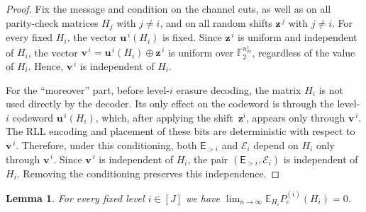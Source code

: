 \documentclass[journal,letterpaper,onecolumn,11pt]{IEEEtran}
\newcommand{\cE}{\mathcal{E}}
\newcommand{\boldu}{\mathbf{u}}
\newcommand{\boldv}{\mathbf{v}}
\newcommand{\boldz}{\mathbf{z}}
\newtheorem{lemma}{Lemma}
\begin{document}
\begin{proof}
Fix the message and condition on the channel cuts, as well as on all parity-check
matrices \(H_j\) with \(j\neq i\), and on all random shifts \(\boldz^{\,j}\) with \(j\neq i\). 
For every fixed \(H_i\), the vector
\(\boldu^{\,i}(H_i)\) is fixed. Since \(\boldz^{\,i}\) is uniform and
independent of \(H_i\), the vector
\(\boldv^{\,i}=\boldu^{\,i}(H_i)\oplus\boldz^{\,i}\) is uniform over
\(\mathbb F_2^{n_{\mathrm{er}}^i}\), regardless of the value of \(H_i\).
Hence, \(\boldv^{\,i}\) is independent of \(H_i\).

For the ``moreover'' part, before level-\(i\) erasure decoding,
the matrix \(H_i\) is not used directly by the decoder. Its only effect
on the codeword is through the level-\(i\) codeword
\(\boldu^{\,i}(H_i)\), which, after applying the shift~$\boldz^i$, appears only
through \(\boldv^{\,i}\). 
The RLL encoding and placement of these bits
are deterministic with respect to \(\boldv^{\,i}\).
Therefore, under this conditioning, both \(\mathsf E_{>i}\) and
\(\cE_i\) depend on \(H_i\) only through \(\boldv^{\,i}\).
Since \(\boldv^{\,i}\) is independent of \(H_i\), the pair
\((\mathsf E_{>i},\cE_i)\) is independent of \(H_i\).
Removing the conditioning preserves this independence.
\end{proof}

\begin{lemma}\label{lemma:random_matrix_capacity}
For every fixed level \(i\in[J]\) we have $\lim_{n\to\infty}\mathbb E_{H_i}\!P_e^{(i)}(H_i)=0$.
\end{lemma}
\end{document}
